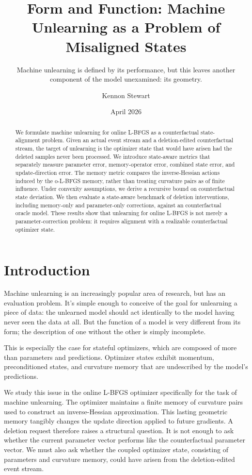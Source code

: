 \documentclass{ssl}
\title{Form and Function: Machine Unlearning as a Problem of Misaligned States}
\subtitle{Machine unlearning is defined by its performance, but this leaves another component of the model unexamined: its geometry.}
\author{Kennon Stewart\affilnum{1,2}}
\affiliation{\affilnum{1} Second Street Labs, Detroit, MI, USA\\
\affilnum{2} Department of Statistics, University of Michigan, Ann Arbor, MI, USA}
\date{April 2026}
\begin{document}
\begin{abstract}
We formulate machine unlearning for online L-BFGS as a counterfactual state-alignment problem. Given an actual event stream and a deletion-edited counterfactual stream, the target of unlearning is the optimizer state that would have arisen had the deleted samples never been processed. We introduce state-aware metrics that separately measure parameter error, memory-operator error, combined state error, and update-direction error. The memory metric compares the inverse-Hessian actions induced by the o-L-BFGS memory, rather than treating curvature pairs as of finite influence. Under convexity assumptions, we derive a recursive bound on counterfactual state deviation. We then evaluate a state-aware benchmark of deletion interventions, including memory-only and parameter-only corrections, against an counterfactual oracle model. These results show that unlearning for online L-BFGS is not merely a parameter-correction problem: it requires alignment with a realizable counterfactual optimizer state.
\end{abstract}
\maketitle


\section{Introduction}
Machine unlearning is an increasingly popular area of research, but has an evaluation problem. It's simple enough to conceive of the goal for unlearning a piece of data: the unlearned model should act identically to the model having never seen the data at all. But the function of a model is very different from its form; the description of one without the other is simply incomplete.

This is especially the case for stateful optimizers, which are composed of more than parameters and predictions. Optimizer states exhibit momentum, preconditioned states, and curvature memory that are undescribed by the model's predictions.

We study this issue in the online L-BFGS optimizer specifically for the task of machine unlearning. The optimizer maintains a finite memory of curvature pairs used to construct an inverse-Hessian approximation. This lasting geometric memory tangibly changes the update direction applied to future gradients. A deletion request therefore raises a structural question. It is not enough to ask whether the current parameter vector performs like the counterfactual parameter vector. We must also ask whether the coupled optimizer state, consisting of parameters and curvature memory, could have arisen from the deletion-edited event stream.
\end{document}

